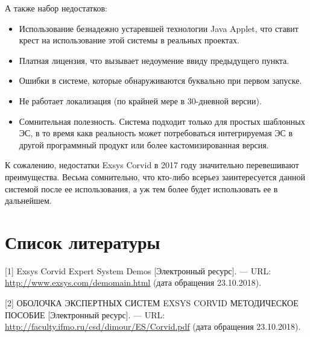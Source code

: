 \documentclass[14pt,a4paper,report]{report}
\begin{document}
А также набор недостатков:

\begin{itemize}
	\item Использование безнадежно устаревшей технологии Java Applet, что ставит крест на использование этой системы в реальных проектах.
	\item Платная лицензия, что вызывает недоумение ввиду предыдущего пункта.
	\item Ошибки в системе, которые обнаруживаются буквально при первом запуске.
	\item Не работает локализация (по крайней мере в 30-дневной версии).
	\item Сомнительная полезность. Система подходит только для простых шаблонных ЭС, в то время какв реальность может потребоваться интегрируемая ЭС в другой программный продукт или более кастомизированная версия.
\end{itemize}

К сожалению, недостатки Exsys Corvid в 2017 году значительно перевешивают преимущества. Весьма сомнительно, что кто-либо всерьез заинтересуется данной системой после ее использования, а уж тем более будет использовать ее в дальнейшем.

\section{Список литературы}


\begin{flushleft}
	
[1] Exsys Corvid Expert System Demos [Электронный ресурс]. — URL: \href{http://www.exsys.com/demomain.html}{http://www.exsys.com/demomain.html} (дата обращения 23.10.2018). \linebreak

[2] ОБОЛОЧКА ЭКСПЕРТНЫХ СИСТЕМ EXSYS CORVID МЕТОДИЧЕСКОЕ ПОСОБИЕ [Электронный ресурс]. — URL: \href{http://faculty.ifmo.ru/csd/dimour/ES/Corvid.pdf}{http://faculty.ifmo.ru/csd/dimour/ES/Corvid.pdf} (дата обращения 23.10.2018). \linebreak

\end{flushleft}
	
\end{document}
